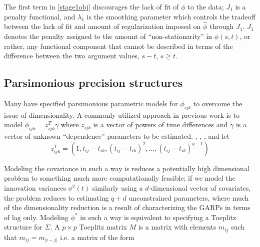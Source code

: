 \documentclass[12pt]{article}
\begin{document}
The first term in \eqref{stage1obj} discourages the lack of fit of $\phi$ to the data; $J_1$ is a penalty functional, and $\lambda_1$ is the smoothing parameter which controls the tradeoff between the lack of fit and amount of regularization imposed on $\hat{\phi}$ through $J_1$.  $J_1$ denotes the penalty assigned to the amount of ``non-stationarity'' in $\phi\left(s,t\right)$, or rather, any functional component that cannot be described in terms of the difference between the two argument values, $s-t$, $s \ge t$. %

\subsection{Parsimonious  precision  structures}

Many have specified parsimonious parametric models for $\phi_{ijk}$ to overcome the issue of dimensionality. A commonly utilized approach in previous work is to model $\phi_{ijk} = z_{ijk}^T \gamma$ where $z_{ijk}$ is a vector of powers of time differences and $\gamma$ is a vector of unknown ``dependence'' parameters to be estimated. \citet{chen2011efficient}, \citet{lin2009robust}, \citet{pan2003modelling},  and \citet{pourahmadi1999joint} let 
\begin{equation}
z_{ijk}^T = \left(1, t_{ij} - t_{ik},\left( t_{ij} - t_{ik} \right)^2, \dots, \left(t_{ij} - t_{ik}\right)^{q-1} \right) \label{covmodel}
\end{equation}


Modeling the covariance in such a way is reduces a potentially high dimensional problem to something much more computationally feasible; if we model the innovation variances $\sigma^2\left(t\right)$ similarly using a $d$-dimensional vector of covariates, the problem reduces to estimating $q+d$ unconstrained parameters, where much of the dimensionality reduction is a result of characterizing the GARPs in terms of lag only. Modeling $\phi^*$ in such a way is equivalent to specifying a Toeplitz structure for $\Sigma$. A $p \times p$ Toeplitz matrix $M$ is a matrix with elements $m_{ij}$ such that $m_{ij} = m_{\vert i-j \vert}$ i.e. a matrix of the form
\end{document}
